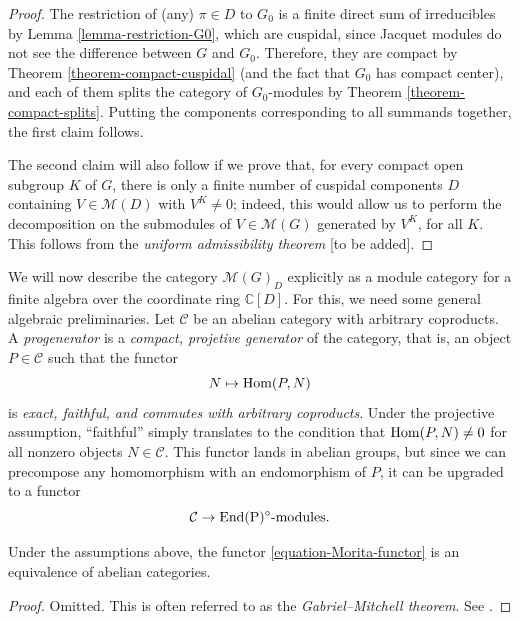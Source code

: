 \begin{proof}
The restriction of (any) $\pi\in D$ to $G_0$ is a finite direct sum of irreducibles by Lemma \ref{lemma-restriction-G0}, which are cuspidal, since Jacquet modules do not see the difference between $G$ and $G_0$. Therefore, they are compact by Theorem \ref{theorem-compact-cuspidal} (and the fact that $G_0$ has compact center), and each of them splits the category of $G_0$-modules by Theorem \ref{theorem-compact-splits}. Putting the components corresponding to all summands together, the first claim follows.

The second claim will also follow if we prove that, for every compact open subgroup $K$ of $G$, there is only a finite number of cuspidal components $D$ containing $V\in \mathcal M(D)$ with $V^K\ne 0$; indeed, this would allow us to perform the decomposition on the submodules of $V\in \mathcal M(G)$ generated by $V^K$, for all $K$. This follows from the \emph{uniform admissibility theorem} [to be added].
\end{proof}

We will now describe the category $\mathcal M(G)_D$ explicitly as a module category for a finite algebra over the coordinate ring $\mathbb C[D]$. For this, we need some general algebraic preliminaries. Let $\mathcal C$ be an abelian category with arbitrary coproducts. A {\it progenerator} is a \emph{compact, projetive generator} of the category, that is, an object $P\in \mathcal C$ such that the functor 
$$ N\mapsto \mathop{\rm Hom}\nolimits(P,N)$$
is \emph{exact, faithful, and commutes with arbitrary coproducts}. Under the projective assumption, ``faithful'' simply translates to the condition that $\mathop{\rm Hom}\nolimits(P,N)\ne 0$ for all nonzero objects $N\in \mathcal C$. This functor lands in abelian groups, but since we can precompose any homomorphism with an endomorphism of $P$, it can be upgraded to a functor
\begin{equation}
	\label{equation-Morita-functor}
\mathcal C\to \rm{End}(P)^\circ\text{-modules}.
\end{equation}

\begin{theorem}
	\label{theorem-Morita}
Under the assumptions above, the functor \eqref{equation-Morita-functor} is an equivalence of abelian categories.
\end{theorem}

\begin{proof}
	Omitted. This is often referred to as the {\it Gabriel--Mitchell theorem}. See \cite[Theorem II.1.3]{Bass-Ktheory}.
\end{proof}

